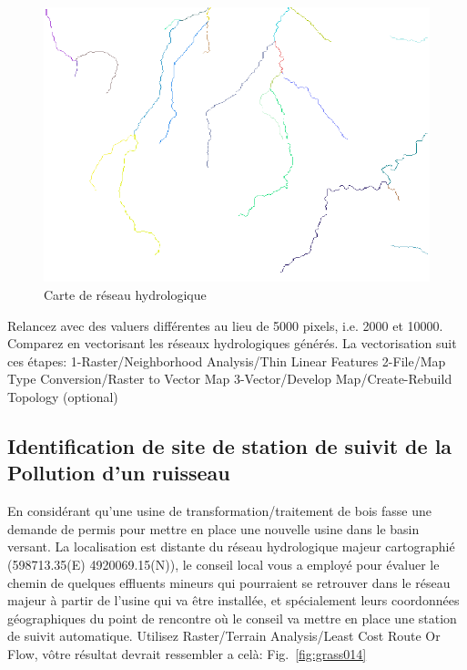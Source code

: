 \begin{figure}[htbp]
   \centering
   \includegraphics[scale=0.35]{grass013.png}
   \caption{Carte de r\'eseau hydrologique}
   \label{fig:grass013}
\end{figure}

Relancez avec des valuers diff\'erentes au lieu de 5000 pixels, i.e. 2000 et 10000.
Comparez en vectorisant les r\'eseaux hydrologiques g\'en\'er\'es. La vectorisation suit ces \'etapes:
1-Raster/Neighborhood Analysis/Thin Linear Features
2-File/Map Type Conversion/Raster to Vector Map
3-Vector/Develop Map/Create-Rebuild Topology (optional)

\subsection{Identification de site de station de suivit de la Pollution d'un ruisseau}
En consid\'erant qu'une usine de transformation/traitement de bois fasse une demande de permis pour mettre en place une nouvelle usine dans le basin versant. La localisation est distante du r\'eseau hydrologique majeur cartographi\'e (598713.35(E) 4920069.15(N)), le conseil local vous a employ\'e pour \'evaluer le chemin de quelques effluents mineurs qui pourraient se retrouver dans le r\'eseau majeur \`a partir de l'usine qui va \^etre install\'ee, et sp\'ecialement leurs coordonn\'ees g\'eographiques du point de rencontre o\`u le conseil va mettre en place une station de suivit automatique.
Utilisez Raster/Terrain Analysis/Least Cost Route Or Flow, v\^otre r\'esultat devrait ressembler a cel\`a: Fig.~\ref{fig:grass014}

